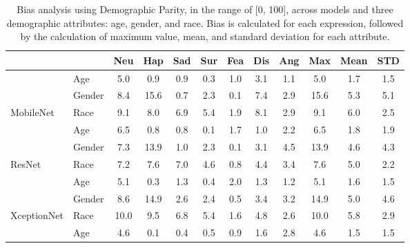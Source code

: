 \begin{table}[t] 
\caption{Bias analysis using Demographic Parity, in the range of [0, 100], across models and three demographic attributes: age, gender, and race. Bias is calculated for each expression, followed by the calculation of maximum value, mean, and standard deviation for each attribute.}
\label{tbl:bias_demographic_parity}
\centering
\small
\setlength{\tabcolsep}{3pt} %
\resizebox{0.965\linewidth}{!}
{
\begin{tabular}{ll|>{\color{mediumgray}}c>{\color{mediumgray}}c>{\color{mediumgray}}c>{\color{mediumgray}}c>{\color{mediumgray}}c>{\color{mediumgray}}c>{\color{mediumgray}}c|ccc}
                                                   &        & \color{black}Neu & \color{black}Hap & \color{black}Sad 
                                                            & \color{black}Sur & \color{black}Fea & \color{black}Dis 
                                                            & \color{black}Ang & Max & Mean & STD \\ \hline
\multicolumn{1}{l|}{}                              & Age& 5.0 & 0.9 & 0.9 & 0.3 & 1.0 & 3.1 & 1.1 & 5.0 & 1.7 & 1.5 \\
\multicolumn{1}{l|}{}                              & Gender & 8.4 & 15.6 & 0.7 & 2.3 & 0.1 & 7.4 & 2.9 & 15.6 & 5.3 & 5.1 \\
\multicolumn{1}{l|}{\multirow{-3}{*}{MobileNet}}   & Race& 9.1 & 8.0 & 6.9 & 5.4 & 1.9 & 8.1 & 2.9 & 9.1 & 6.0 & 2.5 \\ \hline
\multicolumn{1}{l|}{}                              & Age& 6.5 & 0.8 & 0.8 & 0.1 & 1.7 & 1.0 & 2.2 & 6.5 & 1.8 & 1.9 \\
\multicolumn{1}{l|}{}                              & Gender & 7.3 & 13.9 & 1.0 & 2.3 & 0.1 & 3.1 & 4.5 & 13.9 & 4.6 & 4.3 \\
\multicolumn{1}{l|}{\multirow{-3}{*}{ResNet}}      & Race& 7.2 & 7.6 & 7.0 & 4.6 & 0.8 & 4.4 & 3.4 & 7.6 & 5.0 & 2.2 \\ \hline
\multicolumn{1}{l|}{}                              & Age& 5.1 & 0.3 & 1.3 & 0.4 & 2.0 & 1.3 & 1.2 & 5.1 & 1.6 & 1.5 \\
\multicolumn{1}{l|}{}                              & Gender & 8.6 & 14.9 & 2.6 & 2.4 & 0.5 & 3.4 & 3.2 & 14.9 & 5.0 & 4.6 \\
\multicolumn{1}{l|}{\multirow{-3}{*}{XceptionNet}} & Race& 10.0 & 9.5 & 6.8 & 5.4 & 1.6 & 4.8 & 2.6 & 10.0 & 5.8 & 2.9 \\ \hline
\multicolumn{1}{l|}{}                              & Age& 4.6 & 0.1 & 0.4 & 0.5 & 0.9 & 1.6 & 2.8 & 4.6 & 1.5 & 1.5 \\

\end{tabular}}
\end{table}

